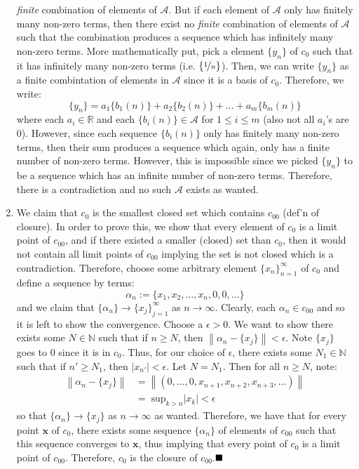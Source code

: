 \documentclass{article}
\newcommand{\norm}[1]{\left\lVert#1\right\rVert}
\begin{document}
\begin{enumerate}
            \textit{finite} combination of elements of $\mathcal{A}$. But if each element of $\mathcal{A}$ only has finitely
            many non-zero terms, then there exist no \textit{finite} combination of elements of $\mathcal{A}$ such that the
            combination produces a sequence which has infinitely many non-zero terms. More mathematically put, pick a
            element $\{y_n\}$ of $c_0$ such that it has infinitely many non-zero terms (i.e. $\{\nicefrac{1}{n}\}$). Then, we can
            write $\{y_n\}$ as a finite combintation of elements in $\mathcal{A}$ since it is a basis of $c_0$. Therefore, we write:
            \[ \{y_n\} = a_1\{b_1(n)\} + a_2\{b_2(n)\} + \hdots + a_m\{b_m(n)\} \]
            where each $a_i\in\mathbb{R}$ and each $\{b_i(n)\}\in\mathcal{A}$ for $1\leq i\leq m$ (also not all $a_i$'s are 0). 
            However, since each sequence $\{b_i(n)\}$ only has finitely many non-zero terms, then their sum produces a sequence 
            which again, only has a finite number of non-zero terms. However, this is impossible since we picked $\{y_n\}$ to be 
            a sequence which has an infinite number of non-zero terms. Therefore, there is a contradiction
            and no such $\mathcal{A}$ exists as wanted.
        \item We claim that $c_0$ is the smallest closed set which contains $c_{00}$ (def'n of closure). In order to prove this, we show
            that every element of $c_0$ is a limit point of $c_{00}$, and if there existed a smaller (closed) set than $c_0$, then
            it would not contain all limit points of $c_{00}$ implying the set is not closed which is a contradiction. 
            Therefore, choose some arbitrary element $\{x_n\}_{n=1}^{\infty}$ of $c_0$ and define a sequence by terms:
            \[ \alpha_n := \{x_1,x_2,\hdots,x_n,0,0,\hdots\} \]
            and we claim that $\{\alpha_n\}\to \{x_j\}_{j=1}^{\infty}$ as $n\to\infty$. Clearly, each $\alpha_n\in c_{00}$ and
            so it is left to show the convergence. Choose a $\epsilon>0$. We want to show there exists some $N\in\mathbb{N}$
            such that if $n\geq N$, then $\norm{\alpha_n - \{x_j\}} < \epsilon$. Note $\{x_j\}$ goes to 0 since it is in $c_0$.
            Thus, for our choice of $\epsilon$, there exists some $N_1\in\mathbb{N}$ such that if $n'\geq N_1$, then $|x_{n'}|<\epsilon$.
            Let $N = N_1$. Then for all $n\geq N$, note:
            \begin{align*}
                \norm{\alpha_n - \{x_j\}} &= \norm{(0,\hdots,0,x_{n+1},x_{n+2},x_{n+3},\hdots)} \\
                &=\;\text{sup}_{k>n}|x_k| < \epsilon
            \end{align*}
            so that $\{\alpha_n\}\to\{x_j\}$ as $n\to\infty$ as wanted. Therefore, we have that for every point $\mathbf{x}$ of $c_0$,
            there exists some sequence $\{\alpha_n\}$ of elements of $c_{00}$ such that this sequence converges to $\mathbf{x}$,
            thus implying that every point of $c_0$ is a limit point of $c_{00}$. Therefore, $c_0$ is the closure
            of $c_{00}$.$\hfill\blacksquare$
    \end{enumerate}
\end{document}
